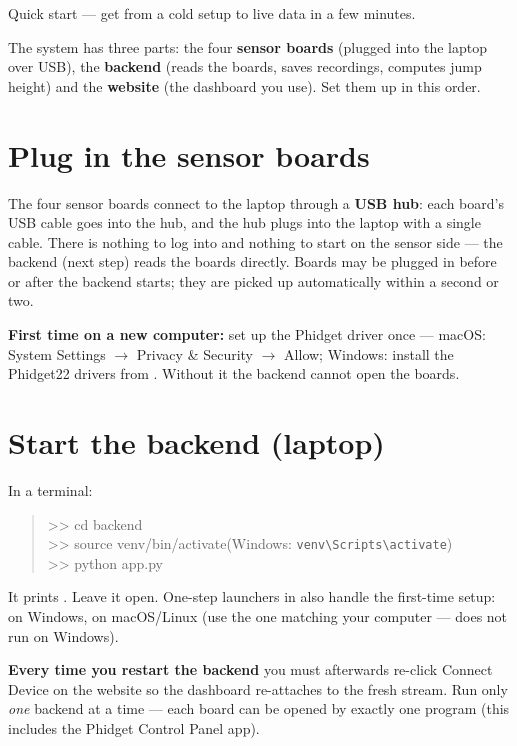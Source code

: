 \documentclass[11pt,a4paper]{article}
\begin{document}
%
  {Quick start --- get from a cold setup to live data in a few minutes.}

The system has three parts: the four \textbf{sensor boards} (plugged into the
laptop over USB), the \textbf{backend} (reads the boards, saves recordings,
computes jump height) and the \textbf{website} (the dashboard you use). Set them
up in this order.

\section{Plug in the sensor boards}
The four sensor boards connect to the laptop through a \textbf{USB hub}: each
board's USB cable goes into the hub, and the hub plugs into the laptop with a
single cable. There is nothing to log into and nothing to start on the sensor
side --- the backend (next step) reads the boards directly. Boards may be plugged
in before or after the backend starts; they are picked up automatically within a
second or two.

\begin{infobox}
\textbf{First time on a new computer:} set up the Phidget driver once ---
macOS: \textsf{System Settings $\rightarrow$ Privacy \& Security} $\rightarrow$
\textsf{Allow}; Windows: install the Phidget22 drivers from
. Without it the backend cannot open the boards.
\end{infobox}

\section{Start the backend (laptop)}
In a terminal:
\begin{quote}\ttfamily\small
>> cd backend\\
>> source venv/bin/activate\hfill\textrm{\footnotesize(Windows: \texttt{venv\textbackslash Scripts\textbackslash activate})}\\
>> python app.py
\end{quote}
It prints . Leave it open. One-step
launchers in  also handle the first-time setup:
 on Windows,  on macOS/Linux
(use the one matching your computer ---  does not run on Windows).

\begin{infobox}
\textbf{Every time you restart the backend} you must afterwards re-click
\textsf{Connect Device} on the website so the dashboard re-attaches to the fresh
stream. Run only \emph{one} backend at a time --- each board can be opened by
exactly one program (this includes the Phidget Control Panel app).
\end{infobox}
\end{document}
